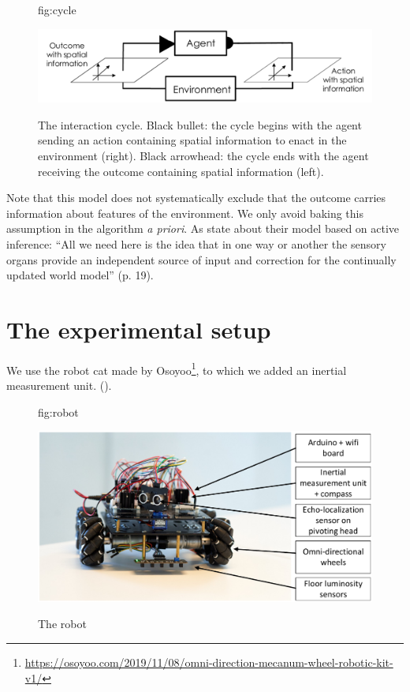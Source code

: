 \documentclass[pmlr]{jmlr}%
\begin{document}
\begin{figure}[htbp]
	\floatconts
	{fig:cycle}
	{\caption{The interaction cycle. Black bullet: the cycle begins with the agent sending an action containing spatial information to enact in the environment (right). Black arrowhead: the cycle ends with the agent receiving the outcome containing spatial information (left).}}
	{\includegraphics[width=0.8\linewidth]{images/Figure_0_Cycle}}
\end{figure}

Note that this model does not systematically exclude that the outcome carries information about features of the environment. 
We only avoid baking this assumption in the algorithm \textit{a priori}. 
As \cite{rudrauf_mathematical_2017} state about their model based on active inference: ``All we need here is the idea that in one way or another the sensory organs provide an independent source of input and correction for the continually updated world model'' (p. 19).

\section{The experimental setup}
\label{sec:experiment}

We use the robot cat made by Osoyoo\footnote{\url{https://osoyoo.com/2019/11/08/omni-direction-mecanum-wheel-robotic-kit-v1/}}, to which we added an inertial measurement unit.  ().

\begin{figure}[htbp]
	\floatconts
	{fig:robot}
	{\caption{The robot}}
	{\includegraphics[width=0.8\linewidth]{images/Figure_1_Robot}}
\end{figure}
\end{document}
